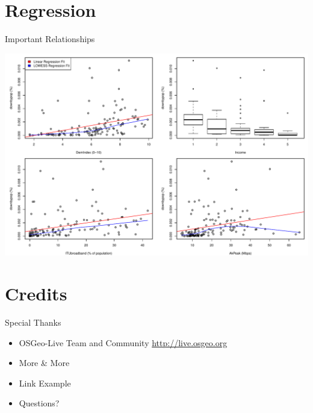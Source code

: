 \documentclass{beamer}
\begin{document}
\section{Regression}
\begin{frame}{Important Relationships}
	\begin{center}
			\includegraphics[width=1\textwidth]{ImportantVarGraph.pdf}	
	\end{center}
\end{frame}

\section{Credits}
\begin{frame}{Special Thanks}
	\begin{itemize}
		\item OSGeo-Live Team and Community \url{http://live.osgeo.org}
		\item More \& More
		\item Link Example %
		\item Questions?
		\begin{center}
		\end{center}
	\end{itemize}
\end{frame}


\end{document}
